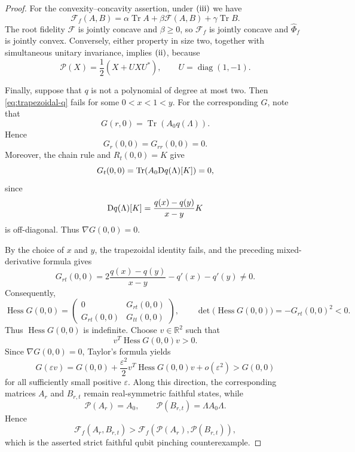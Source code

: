 \documentclass[11pt]{amsart}
\theoremstyle{definition}
\theoremstyle{remark}
\newcommand{\Tr}{\operatorname{Tr}}
\newcommand{\altPhi}{\widehat{\Phi}}
\begin{document}
\begin{proof}
For the convexity--concavity assertion, under ${\rm(iii)}$ we have
\[
\mathcal F_f(A,B)
=\alpha\Tr A+\beta\mathcal F(A,B)+\gamma\Tr B.
\]
The root fidelity $\mathcal F$ is jointly concave and $\beta\ge0$,
so $\mathcal F_f$ is jointly concave and $\altPhi_f$ is jointly
convex.  Conversely, either property in size two, together with
simultaneous unitary invariance, implies ${\rm(ii)}$, because
\[
\mathcal P(X)=\frac12(X+UXU^*),
\qquad
U=\operatorname{diag}(1,-1).
\]

Finally, suppose that $q$ is not a polynomial of degree at most two.
Then \eqref{eq:trapezoidal-q} fails for some $0<x<1<y$.  For the
corresponding $G$, note that
\[
G(r,0)=\Tr(A_0q(\Lambda)).
\]
Hence
\[
G_r(0,0)=G_{rr}(0,0)=0.
\]
Moreover, the chain rule and $R_t(0,0)=K$ give
\[
G_t(0,0)
=\Tr\!\left(A_0{\rm D}q(\Lambda)[K]\right)=0,
\]
since
\[
{\rm D}q(\Lambda)[K]
=\frac{q(x)-q(y)}{x-y}K
\]
is off-diagonal.  Thus $\nabla G(0,0)=0$.

By the choice of $x$ and $y$, the trapezoidal identity fails, and the
preceding mixed-derivative formula gives
\[
G_{rt}(0,0)
=
2\frac{q(x)-q(y)}{x-y}-q'(x)-q'(y)
\ne0.
\]
Consequently,
\[
\operatorname{Hess}G(0,0)
=
\begin{pmatrix}
	0&G_{rt}(0,0)\\
	G_{rt}(0,0)&G_{tt}(0,0)
\end{pmatrix},
\qquad
\det\!\bigl(\operatorname{Hess}G(0,0)\bigr)
=-G_{rt}(0,0)^2<0.
\]
Thus $\operatorname{Hess}G(0,0)$ is indefinite. Choose
$v\in\mathbb R^2$ such that
\[
v^{T}\operatorname{Hess}G(0,0)v>0.
\]
Since $\nabla G(0,0)=0$, Taylor's formula yields
\[
G(\varepsilon v)
=
G(0,0)
+\frac{\varepsilon^2}{2}
v^{T}\operatorname{Hess}G(0,0)v
+o(\varepsilon^2)
>G(0,0)
\]
for all sufficiently small positive $\varepsilon$.  Along this
direction, the corresponding matrices $A_r$ and $B_{r,t}$ remain
real-symmetric faithful states, while
\[
\mathcal P(A_r)=A_0,
\qquad
\mathcal P(B_{r,t})=\Lambda A_0\Lambda.
\]
Hence
\[
\mathcal F_f(A_r,B_{r,t})
>
\mathcal F_f(\mathcal P(A_r),\mathcal P(B_{r,t})),
\]
which is the asserted strict faithful qubit pinching counterexample.
\end{proof}
\end{document}
